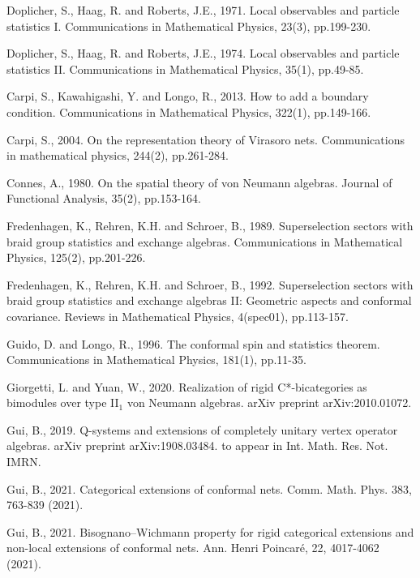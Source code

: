 \documentclass[11pt,b5paper,notitlepage]{article}
\theoremstyle{definition}
\theoremstyle{plain}
\numberwithin{equation}{section}
\begin{document}
\begin{thebibliography}{999999}
Doplicher, S., Haag, R. and Roberts, J.E., 1971. Local observables and particle statistics I. Communications in Mathematical Physics, 23(3), pp.199-230.

Doplicher, S., Haag, R. and Roberts, J.E., 1974. Local observables and particle statistics II. Communications in Mathematical Physics, 35(1), pp.49-85.

Carpi, S., Kawahigashi, Y. and Longo, R., 2013. How to add a boundary condition. Communications in Mathematical Physics, 322(1), pp.149-166.

Carpi, S., 2004. On the representation theory of Virasoro nets. Communications in mathematical physics, 244(2), pp.261-284.

Connes, A., 1980. On the spatial theory of von Neumann algebras. Journal of Functional Analysis, 35(2), pp.153-164.

Fredenhagen, K., Rehren, K.H. and Schroer, B., 1989. Superselection sectors with braid group statistics and exchange algebras. Communications in Mathematical Physics, 125(2), pp.201-226.

Fredenhagen, K., Rehren, K.H. and Schroer, B., 1992. Superselection sectors with braid group statistics and exchange algebras II: Geometric aspects and conformal covariance. Reviews in Mathematical Physics, 4(spec01), pp.113-157.

Guido, D. and Longo, R., 1996. The conformal spin and statistics theorem. Communications in Mathematical Physics, 181(1), pp.11-35.

Giorgetti, L. and Yuan, W., 2020. Realization of rigid C*-bicategories as bimodules over type II$_1 $ von Neumann algebras. arXiv preprint arXiv:2010.01072.


Gui, B., 2019. Q-systems and extensions of completely unitary vertex operator algebras. arXiv preprint arXiv:1908.03484. to appear in Int. Math. Res. Not. IMRN.

Gui, B., 2021. Categorical extensions of conformal nets. Comm. Math. Phys. 383, 763-839 (2021).

Gui, B., 2021. Bisognano–Wichmann property for rigid categorical extensions and non-local extensions of conformal nets. Ann. Henri Poincaré, 22, 4017-4062 (2021).





\end{thebibliography}
\end{document}
